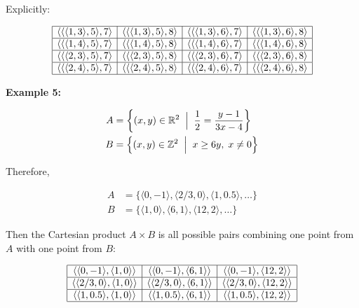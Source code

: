 \documentclass[12pt,a4paper,openany]{article}
\begin{document}
Explicitly:

$$
\begin{array}{|c|c|c|c|}
\hline
\langle \langle \langle 1,3 \rangle, 5 \rangle, 7 \rangle & \langle \langle \langle 1,3 \rangle, 5 \rangle, 8 \rangle & \langle \langle \langle 1,3 \rangle, 6 \rangle, 7 \rangle & \langle \langle \langle 1,3 \rangle, 6 \rangle, 8 \rangle \\ \hline
\langle \langle \langle 1,4 \rangle, 5 \rangle, 7 \rangle & \langle \langle \langle 1,4 \rangle, 5 \rangle, 8 \rangle & \langle \langle \langle 1,4 \rangle, 6 \rangle, 7 \rangle & \langle \langle \langle 1,4 \rangle, 6 \rangle, 8 \rangle \\ \hline
\langle \langle \langle 2,3 \rangle, 5 \rangle, 7 \rangle & \langle \langle \langle 2,3 \rangle, 5 \rangle, 8 \rangle & \langle \langle \langle 2,3 \rangle, 6 \rangle, 7 \rangle & \langle \langle \langle 2,3 \rangle, 6 \rangle, 8 \rangle \\ \hline
\langle \langle \langle 2,4 \rangle, 5 \rangle, 7 \rangle & \langle \langle \langle 2,4 \rangle, 5 \rangle, 8 \rangle & \langle \langle \langle 2,4 \rangle, 6 \rangle, 7 \rangle & \langle \langle \langle 2,4 \rangle, 6 \rangle, 8 \rangle \\ \hline
\end{array}
$$


\textbf{Example 5:}

$$
\begin{aligned}
A &= \left\{ (x, y) \in \mathbb{R}^2 \;\Bigm|\; \frac{1}{2} = \frac{y-1}{3x-4}\right\} \\
B &= \left\{ (x, y) \in \mathbb{Z}^2 \;\Bigm|\; x \ge 6y, \; x \neq 0 \right\}
\end{aligned}
$$

Therefore, 

$$
\begin{aligned}
A &=  \{ \langle 0, -1 \rangle, \langle 2/3, 0 \rangle, \langle 1, 0.5 \rangle, \dots \}\\
B &=  \{ \langle 1, 0 \rangle, \langle 6, 1 \rangle, \langle 12, 2 \rangle, \dots \}
\end{aligned}
$$

Then the Cartesian product $A \times B$ is all possible pairs combining one point from $A$ with one point from $B$:

$$
\begin{array}{|c|c|c|}
\hline
\langle \langle 0,-1 \rangle, \langle 1,0 \rangle \rangle & \langle \langle 0,-1 \rangle, \langle 6,1 \rangle \rangle & \langle \langle 0,-1 \rangle, \langle 12,2 \rangle \rangle \\ \hline
\langle \langle 2/3,0 \rangle, \langle 1,0 \rangle \rangle & \langle \langle 2/3,0 \rangle, \langle 6,1 \rangle \rangle & \langle \langle 2/3,0 \rangle, \langle 12,2 \rangle \rangle \\ \hline
\langle \langle 1,0.5 \rangle, \langle 1,0 \rangle \rangle & \langle \langle 1,0.5 \rangle, \langle 6,1 \rangle \rangle & \langle \langle 1,0.5 \rangle, \langle 12,2 \rangle \rangle \\ \hline
\end{array}
$$
\end{document}
